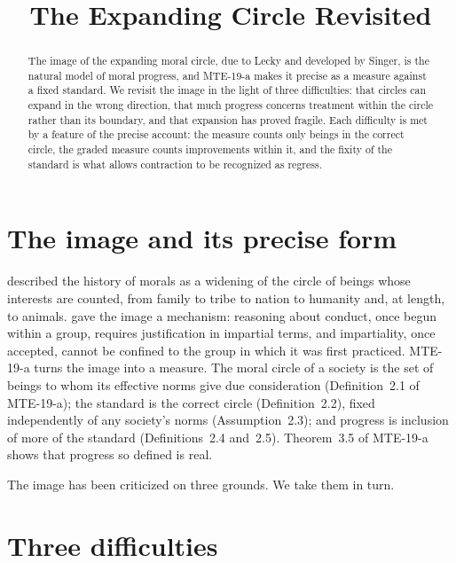 \documentclass{situationist-preprint}
\title{The Expanding Circle Revisited}
\begin{document}
\maketitle

\begin{abstract}
The image of the expanding moral circle, due to Lecky and developed by Singer, is the natural model of moral progress, and MTE-19-a makes it precise as a measure against a fixed standard. We revisit the image in the light of three difficulties: that circles can expand in the wrong direction, that much progress concerns treatment within the circle rather than its boundary, and that expansion has proved fragile. Each difficulty is met by a feature of the precise account: the measure counts only beings in the correct circle, the graded measure counts improvements within it, and the fixity of the standard is what allows contraction to be recognized as regress.
\end{abstract}

\section{The image and its precise form}

\citet{Lecky1869} described the history of morals as a widening of the circle of beings whose interests are counted, from family to tribe to nation to humanity and, at length, to animals. \citet{Singer1981} gave the image a mechanism: reasoning about conduct, once begun within a group, requires justification in impartial terms, and impartiality, once accepted, cannot be confined to the group in which it was first practiced. MTE-19-a turns the image into a measure. The moral circle of a society is the set of beings to whom its effective norms give due consideration (Definition~2.1 of MTE-19-a); the standard is the correct circle (Definition~2.2), fixed independently of any society's norms (Assumption~2.3); and progress is inclusion of more of the standard (Definitions~2.4 and~2.5). Theorem~3.5 of MTE-19-a shows that progress so defined is real.

The image has been criticized on three grounds. We take them in turn.

\section{Three difficulties}
\end{document}
